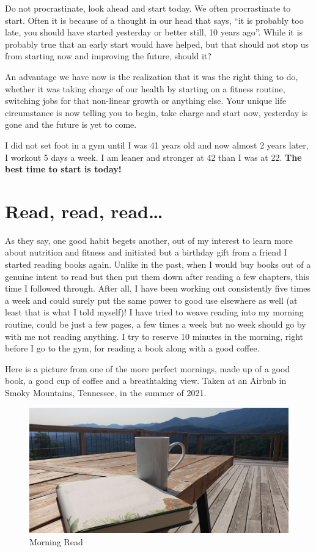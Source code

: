 \documentclass[
  oneside]{book}
\begin{document}
Do not procrastinate, look ahead and start today. We often procrastinate to start. Often it is because of a thought in our head that says, ``it is probably too late, you should have started yesterday or better still, 10 years ago''. While it is probably true that an early start would have helped, but that should not stop us from starting now and improving the future, should it?

An advantage we have now is the realization that it was the right thing to do, whether it was taking charge of our health by starting on a fitness routine, switching jobs for that non-linear growth or anything else. Your unique life circumstance is now telling you to begin, take charge and start now, yesterday is gone and the future is yet to come.

I did not set foot in a gym until I was 41 years old and now almost 2 years later, I workout 5 days a week. I am leaner and stronger at 42 than I was at 22. \textbf{The best time to start is today!}

\hypertarget{read-read-read}{%
\section{Read, read, read\ldots{}}\label{read-read-read}}

As they say, one good habit begets another, out of my interest to learn more about nutrition and fitness and initiated but a birthday gift from a friend I started reading books again. Unlike in the past, when I would buy books out of a genuine intent to read but then put them down after reading a few chapters, this time I followed through. After all, I have been working out consistently five times a week and could surely put the same power to good use elsewhere as well (at least that is what I told myself)! I have tried to weave reading into my morning routine, could be just a few pages, a few times a week but no week should go by with me not reading anything. I try to reserve 10 minutes in the morning, right before I go to the gym, for reading a book along with a good coffee.

Here is a picture from one of the more perfect mornings, made up of a good book, a good cup of coffee and a breathtaking view. Taken at an Airbnb in Smoky Mountains, Tennessee, in the summer of 2021.

\begin{figure}
\centering
\includegraphics{pictures/smoky_morning.png}
\caption{Morning Read}
\end{figure}
\end{document}
